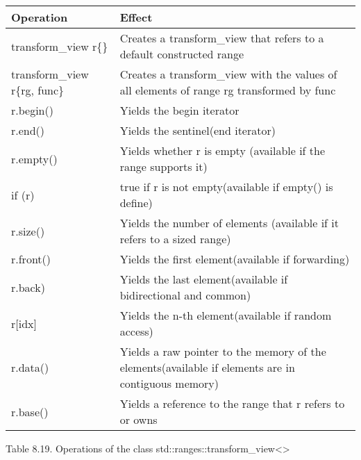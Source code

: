 \begin{longtable}[c]{|l|l|}
\hline
\textbf{Operation} & \textbf{Effect}                                                \\ \hline
\endfirsthead
%
\endhead
%
transform\_view r\{\}         & Creates a transform\_view that refers to a default constructed range                               \\ \hline
transform\_view r\{rg, func\} & Creates a transform\_view with the values of all elements of range rg transformed by func          \\ \hline
r.begin()          & Yields the begin iterator                                      \\ \hline
r.end()            & Yields the sentinel(end iterator)                              \\ \hline
r.empty()          & Yields whether r is empty (available if the range supports it) \\ \hline
if (r)             & true if r is not empty(available if empty() is define)         \\ \hline
r.size()                      & Yields the number of elements (available if it refers to a sized range)                            \\ \hline
r.front()          & Yields the first element(available if forwarding)              \\ \hline
r.back)            & Yields the last element(available if bidirectional and common) \\ \hline
r{[}idx{]}         & Yields the n-th element(available if random access)            \\ \hline
r.data()                      & Yields a raw pointer to the memory of the elements(available if elements are in contiguous memory) \\ \hline
r.base()           & Yields a reference to the range that r refers to or owns       \\ \hline
\end{longtable}

\begin{center}
Table 8.19. Operations of the class std::ranges::transform\_view<>
\end{center}






